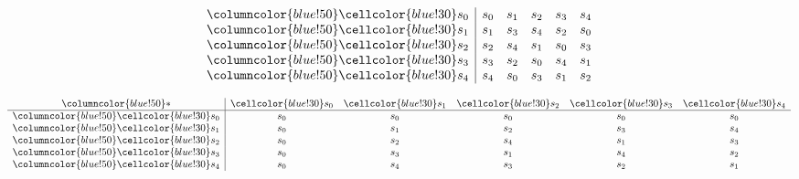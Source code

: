 \documentclass{article}
\begin{document}
\begin{center}
\begin{minipage}{0.23\textwidth}
\[\begin{array}{>{\columncolor{blue!50}}c|ccccc}
    \cellcolor{blue!30}s_0 & s_0 & s_1 & s_2 & s_3 & s_4 \\
    \cellcolor{blue!30}s_1 & s_1 & s_3 & s_4 & s_2 & s_0 \\
    \cellcolor{blue!30}s_2 & s_2 & s_4 & s_1 & s_0 & s_3 \\
    \cellcolor{blue!30}s_3 & s_3 & s_2 & s_0 & s_4 & s_1 \\
    \cellcolor{blue!30}s_4 & s_4 & s_0 & s_3 & s_1 & s_2 \\
    \end{array}
    \]
\end{minipage}%
\hfill
\begin{minipage}{0.23\textwidth}
    \centering
    \small{}
    \renewcommand{\arraystretch}{1} 
    \[
    \begin{array}{>{\columncolor{blue!50}}c|ccccc}
    * & \cellcolor{blue!30}s_0 & \cellcolor{blue!30}s_1 & \cellcolor{blue!30}s_2 & \cellcolor{blue!30}s_3 & \cellcolor{blue!30}s_4 \\ \hline
    \cellcolor{blue!30}s_0 & s_0 & s_0 & s_0 & s_0 & s_0 \\
    \cellcolor{blue!30}s_1 & s_0 & s_1 & s_2 & s_3 & s_4 \\
    \cellcolor{blue!30}s_2 & s_0 & s_2 & s_4 & s_1 & s_3 \\
    \cellcolor{blue!30}s_3 & s_0 & s_3 & s_1 & s_4 & s_2 \\
    \cellcolor{blue!30}s_4 & s_0 & s_4 & s_3 & s_2 & s_1 \\
    \end{array}
    \]
\end{minipage}%


\end{center}
\end{document}
